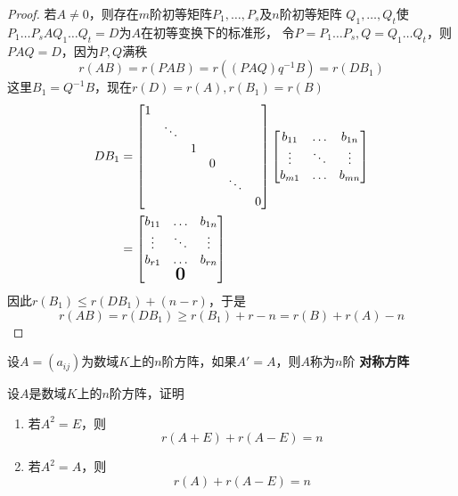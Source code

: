 \documentclass[11pt]{article}
\begin{document}
\begin{proof}
若\(A\neq0\)，则存在\(m\)阶初等矩阵\(P_1,\dots,P_s\)及\(n\)阶初等矩阵
\(Q_1,\dots,Q_t\)使\(P_1\dots P_sAQ_1\dots Q_t=D\)为\(A\)在初等变换下的标准形，
令\(P=P_1\dots P_s,Q=Q_1\dots Q_t\)，则\(PAQ=D\)，因为\(P,Q\)满秩
\begin{equation*}
r(AB)=r(PAB)=r((PAQ)q^{-1}B)=r(DB_1)
\end{equation*}
这里\(B_1=Q^{-1}B\)，现在\(r(D)=r(A),r(B_1)=r(B)\)
\begin{align*}
DB_1&=
\begin{bmatrix}
1&&&&&\\
&\ddots&&&&\\
&&1&&&\\
&&&0&&\\
&&&&\ddots&\\
&&&&&0
\end{bmatrix}
\begin{bmatrix}
b_{11}&\dots&b_{1n}\\
\vdots&\ddots&\vdots\\
b_{m1}&\dots&b_{mn}\\
\end{bmatrix}\\
&=
\begin{bmatrix}
b_{11}&\dots&b_{1n}\\
\vdots&\ddots&\vdots\\
b_{r1}&\dots&b_{rn}\\
&\mbox{\normalfont\Large\bfseries 0}&
\end{bmatrix}
\end{align*}
因此\(r(B_1)\le r(DB_1)+(n-r)\)，于是
\begin{equation*}
r(AB)=r(DB_1)\ge r(B_1)+r-n=r(B)+r(A)-n
\end{equation*}
\end{proof}


设\(A=(a_{ij})\)为数域\(K\)上的\(n\)阶方阵，如果\(A'=A\)，则\(A\)称为\(n\)阶
\textbf{对称方阵}

\begin{exercise}
设\(A\)是数域\(K\)上的\(n\)阶方阵，证明
\begin{enumerate}
\item 若\(A^2=E\)，则
\begin{equation*}
r(A+E)+r(A-E)=n
\end{equation*}
\item 若\(A^2=A\)，则
\begin{equation*}
r(A)+r(A-E)=n
\end{equation*}
\end{enumerate}
\end{exercise}
\end{document}
